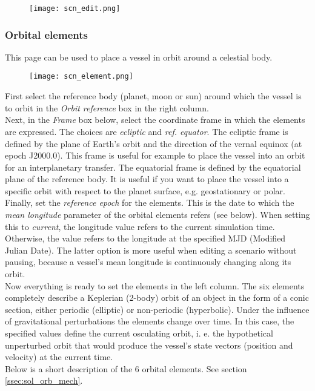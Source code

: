 \documentclass[Orbiter User Manual.tex]{subfiles}
\begin{document}
\begin{figure}[H]
	\centering
	\texttt{[image: scn\_edit.png]}
\end{figure}

\subsubsection{Orbital elements}
This page can be used to place a vessel in orbit around a celestial body.

\begin{figure}[H]
	\centering
	\texttt{[image: scn\_element.png]}
\end{figure}

\noindent
First select the reference body (planet, moon or sun) around which the vessel is to orbit in the \textit{Orbit reference} box in the right column.\\
Next, in the \textit{Frame} box below, select the coordinate frame in which the elements are expressed. The choices are \textit{ecliptic} and \textit{ref. equator}. The ecliptic frame is defined by the plane of Earth's orbit and the direction of the vernal equinox (at epoch J2000.0). This frame is useful for example to place the vessel into an orbit for an interplanetary transfer. The equatorial frame is defined by the equatorial plane of the reference body. It is useful if you want to place the vessel into a specific orbit with respect to the planet surface, e.g. geostationary or polar.\\
Finally, set the \textit{reference epoch} for the elements. This is the date to which the \textit{mean longitude} parameter of the orbital elements refers (see below). When setting this to \textit{current}, the longitude value refers to the current simulation time. Otherwise, the value refers to the longitude at the specified MJD (Modified Julian Date). The latter option is more useful when editing a scenario without pausing, because a vessel's mean longitude is continuously changing along its orbit.\\
Now everything is ready to set the elements in the left column. The six elements completely describe a Keplerian (2-body) orbit of an object in the form of a conic section, either periodic (elliptic) or non-periodic (hyperbolic). Under the influence of gravitational perturbations the  elements change over time. In this case, the specified values define the current osculating orbit, i. e. the hypothetical unperturbed orbit that would produce the vessel's state vectors (position and velocity) at the current time.\\
Below is a short description of the 6 orbital elements. See section \ref{ssec:sol_orb_mech}.
\end{document}

